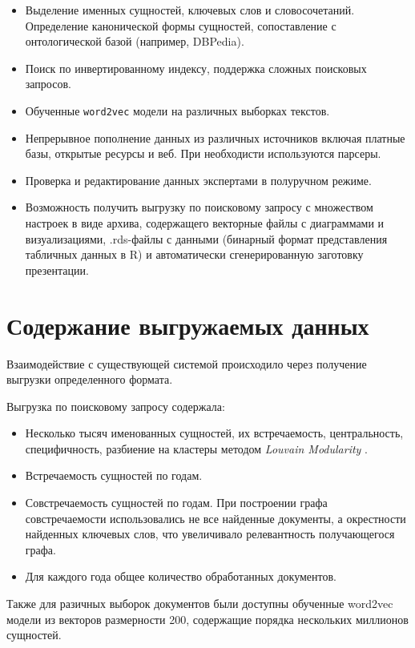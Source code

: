 \begin{itemize}
\item Выделение именных сущностей, ключевых слов и словосочетаний. Определение канонической формы сущностей, сопоставление с онтологической базой (например, DBPedia).
\item Поиск по инвертированному индексу, поддержка сложных поисковых запросов.
\item Обученные \texttt{word2vec} модели на различных выборках текстов.
\item Непрерывное пополнение данных из различных источников включая платные базы, открытые ресурсы и веб. При необходисти используются парсеры.
\item Проверка и редактирование данных экспертами в полуручном режиме.
\item Возможность получить выгрузку по поисковому запросу с множеством настроек в виде архива, содержащего векторные файлы с диаграммами и визуализациями, .rds-файлы с данными (бинарный формат представления табличных данных в R) и автоматически сгенерированную заготовку презентации.
\end{itemize}

\section{Содержание выгружаемых данных}

Взаимодействие с существующей системой происходило через получение выгрузки определенного формата.

Выгрузка по поисковому запросу содержала:

\begin{itemize}
\item Несколько тысяч именованных сущностей, их встречаемость, центральность, специфичность, разбиение на кластеры методом {\itshape Louvain Modularity} \cite{communities}.
\item Встречаемость сущностей по годам.
\item Совстречаемость сущностей по годам. При построении графа совстречаемости использовались не все найденные документы, а окрестности найденных ключевых слов, что увеличивало релевантность получающегося графа.
\item Для каждого года общее количество обработанных документов.
\end{itemize}

Также для разичных выборок документов были доступны обученные word2vec модели из векторов размерности 200, содержащие порядка нескольких миллионов сущностей.

